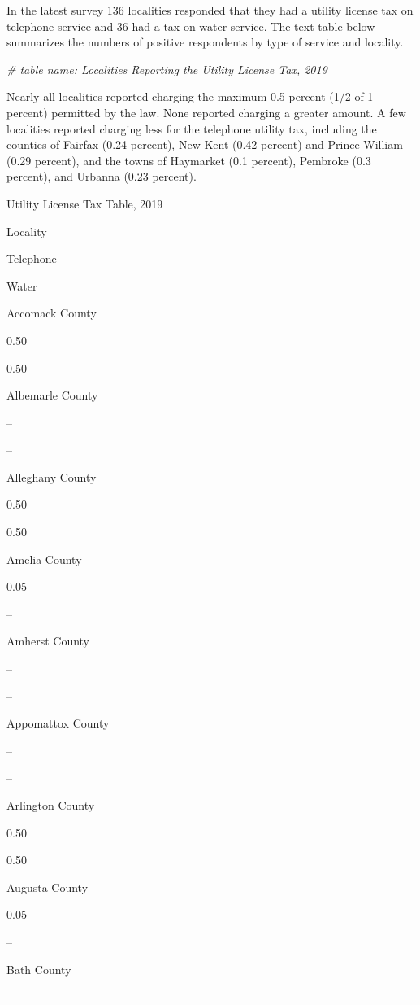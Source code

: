 \documentclass[
]{book}
\newenvironment{Shaded}{\begin{snugshade}}{\end{snugshade}}
\newcommand{\CommentTok}[1]{\textcolor[rgb]{0.56,0.35,0.01}{\textit{#1}}}
\begin{document}
In the latest survey 136 localities responded that they had a utility license tax on telephone service and 36 had a tax on water service. The text table below summarizes the numbers of positive respondents by type of service and locality.

\begin{Shaded}
\begin{Highlighting}[]
\CommentTok{\# table name: Localities Reporting the Utility License Tax, 2019}
\end{Highlighting}
\end{Shaded}

Nearly all localities reported charging the maximum 0.5 percent (1/2 of 1 percent) permitted by the law. None reported charging a greater amount. A few localities reported charging less for the telephone utility tax, including the counties of Fairfax (0.24 percent), New Kent (0.42 percent) and Prince William (0.29 percent), and the towns of Haymarket (0.1 percent), Pembroke (0.3 percent), and Urbanna (0.23 percent).

\label{tab:Table11-1}Utility License Tax Table, 2019

Locality

Telephone

Water

Accomack County

0.50

0.50

Albemarle County

--

--

Alleghany County

0.50

0.50

Amelia County

0.05

--

Amherst County

--

--

Appomattox County

--

--

Arlington County

0.50

0.50

Augusta County

0.05

--

Bath County

--
\end{document}
